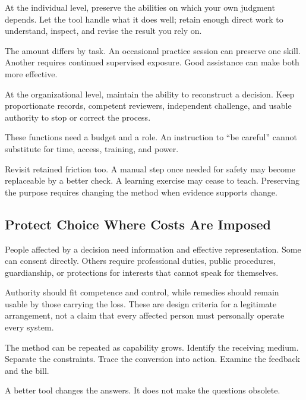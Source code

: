 At the individual level, preserve the abilities on which your own judgment depends. Let the tool handle what it does well; retain enough direct work to understand, inspect, and revise the result you rely on.

The amount differs by task. An occasional practice session can preserve one skill. Another requires continued supervised exposure. Good assistance can make both more effective.

At the organizational level, maintain the ability to reconstruct a decision. Keep proportionate records, competent reviewers, independent challenge, and usable authority to stop or correct the process.

These functions need a budget and a role. An instruction to “be careful” cannot substitute for time, access, training, and power.

Revisit retained friction too. A manual step once needed for safety may become replaceable by a better check. A learning exercise may cease to teach. Preserving the purpose requires changing the method when evidence supports change.

\subsection{Protect Choice Where Costs Are Imposed}

People affected by a decision need information and effective representation. Some can consent directly. Others require professional duties, public procedures, guardianship, or protections for interests that cannot speak for themselves.

Authority should fit competence and control, while remedies should remain usable by those carrying the loss. These are design criteria for a legitimate arrangement, not a claim that every affected person must personally operate every system.

The method can be repeated as capability grows. Identify the receiving medium. Separate the constraints. Trace the conversion into action. Examine the feedback and the bill.

A better tool changes the answers. It does not make the questions obsolete.
